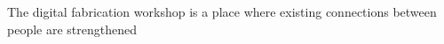 The digital fabrication workshop is a place where existing connections between people are strengthened